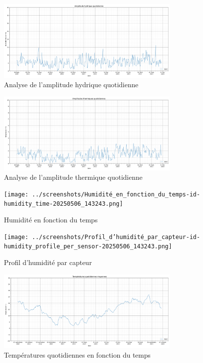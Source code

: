 \documentclass[a4paper,11pt]{article}
\begin{document}
\begin{figure}[h]
    \centering
    \includegraphics[width=0.8\textwidth]{../screenshots/Amplitude_hydrique_quotidienne-id-humidity_amplitude-20250506_143243.png}
    \caption{Analyse de l'amplitude hydrique quotidienne}
\end{figure}

\newpage

\begin{figure}[h]
    \centering
    \includegraphics[width=0.8\textwidth]{../screenshots/Amplitude_thermique_quotidienne-id-temperature_amplitude-20250506_143243.png}
    \caption{Analyse de l'amplitude thermique quotidienne}
\end{figure}

\begin{figure}[h]
    \centering
    \texttt{[image: ../screenshots/Humidité\_en\_fonction\_du\_temps-id-humidity\_time-20250506\_143243.png]}
    \caption{Humidité en fonction du temps}
\end{figure}

\newpage

\begin{figure}[h]
    \centering
    \texttt{[image: ../screenshots/Profil\_d'humidité\_par\_capteur-id-humidity\_profile\_per\_sensor-20250506\_143243.png]}
    \caption{Profil d'humidité par capteur}
\end{figure}

\begin{figure}[h]
    \centering
    \includegraphics[width=0.8\textwidth]{../screenshots/Températures_quotidiennes_(Température_en_fonction_du_temps)-id-temperature_time-20250506_143243.png}
    \caption{Températures quotidiennes en fonction du temps}
\end{figure}
\end{document}
